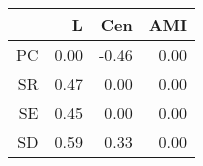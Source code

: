 \begin{table}[ht]
\centering
\begin{tabular}{rrrr}
  \hline
 & L & Cen & AMI \\ 
  \hline
  PC & 0.00 & -0.46 & 0.00 \\ 
  SR & 0.47 & 0.00 & 0.00 \\ 
  SE & 0.45 & 0.00 & 0.00 \\ 
  SD & 0.59 & 0.33 & 0.00 \\ 
   \hline
\end{tabular}
\end{table}

